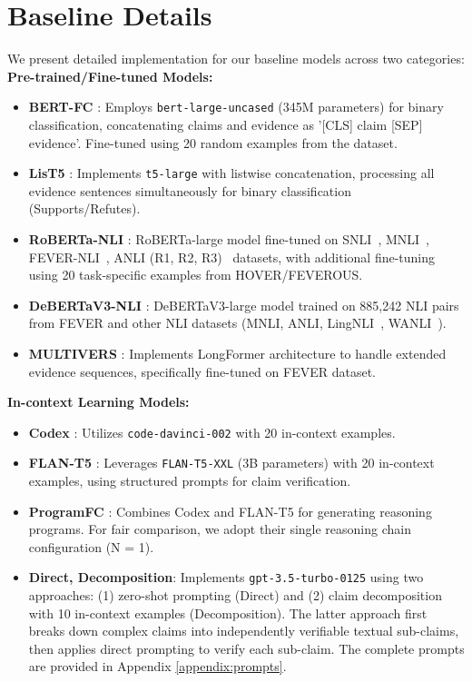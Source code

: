 \section{Baseline Details}
\label{appendix:baselines}
We present detailed implementation for our baseline models across two categories:
\textbf{Pre-trained/Fine-tuned Models:}
\begin{itemize}
\item \textbf{BERT-FC} \cite{soleimani2020bert}: Employs \texttt{bert-large-uncased} (345M parameters) for binary classification, concatenating claims and evidence as '[CLS] claim [SEP] evidence'. Fine-tuned using 20 random examples from the dataset.
\item \textbf{LisT5} \cite{jiang2021exploring}: Implements \texttt{t5-large} with listwise concatenation, processing all evidence sentences simultaneously for binary classification (Supports/Refutes).
\item \textbf{RoBERTa-NLI} \cite{nie2019combining}: RoBERTa-large model fine-tuned on SNLI~\cite{DBLP:conf/emnlp/BowmanAPM15}, MNLI~\cite{DBLP:conf/naacl/WilliamsNB18}, FEVER-NLI~\cite{DBLP:conf/aaai/NieCB19}, ANLI (R1, R2, R3)~\cite{DBLP:conf/acl/NieWDBWK20} datasets, with additional fine-tuning using 20 task-specific examples from HOVER/FEVEROUS.
\item \textbf{DeBERTaV3-NLI} \cite{he2021debertav3}: DeBERTaV3-large model trained on 885,242 NLI pairs from FEVER and other NLI datasets (MNLI, ANLI, LingNLI~\cite{DBLP:conf/emnlp/ParrishHALNWAAL21}, WANLI~\cite{DBLP:journals/corr/abs-2201-05955}).
\item \textbf{MULTIVERS} \cite{wadden2021multivers}: Implements LongFormer \cite{beltagy2020longformer} architecture to handle extended evidence sequences, specifically fine-tuned on FEVER \cite{thorne2018fever} dataset.
\end{itemize}
\textbf{In-context Learning Models:}
\begin{itemize}
\item \textbf{Codex} \cite{chen2021evaluating}: Utilizes \texttt{code-davinci-002} with 20 in-context examples.
\item \textbf{FLAN-T5} \cite{chung2022scaling}: Leverages \texttt{FLAN-T5-XXL} (3B parameters) with 20 in-context examples, using structured prompts for claim verification.
\item \textbf{ProgramFC} \cite{pan2023fact}: Combines Codex and FLAN-T5 for generating reasoning programs. For fair comparison, we adopt their single reasoning chain configuration (N = 1).
\item \textbf{Direct, Decomposition}: Implements \texttt{gpt-3.5-turbo-0125} using two approaches: (1) zero-shot prompting (Direct) and (2) claim decomposition with 10 in-context examples (Decomposition). The latter approach first breaks down complex claims into independently verifiable textual sub-claims, then applies direct prompting to verify each sub-claim. The complete prompts are provided in Appendix \ref{appendix:prompts}. 
\end{itemize}


